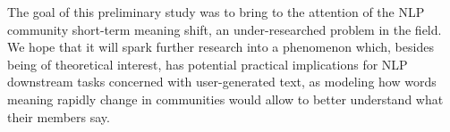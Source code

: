 The goal of this preliminary study was to bring to the attention of the NLP community short-term meaning shift, an under-researched problem in the field. 
We hope that it will spark further research into a phenomenon which, besides being of theoretical interest, has potential practical implications for NLP downstream tasks concerned with user-generated text, as modeling how words meaning rapidly change in communities would allow to better understand what their members say.


